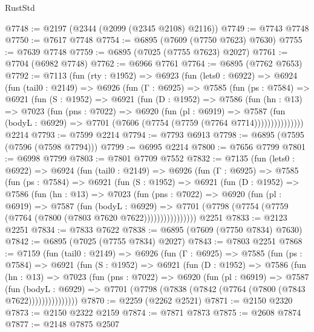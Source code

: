 \begin{lexlean}{RustStd}
\begin{coremodule}
@7748 := @2197 (@2344 (@2099 (@2345 @2108) @2116))
@7749 := @7743 @7748
@7750 := @7617 @7748
@7754 := @6895 (@7609 (@7750 @7623) @7630)
@7755 := @7639 @7748
@7759 := @6895 (@7025 (@7755 @7623) @2027)
@7761 := @7704 (@6982 @7748)
@7762 := @6966 @7761
@7764 := @6895 (@7762 @7653)
@7792 := @7113
    (fun (rty : @1952) =>
    @6923
      (fun (lets0 : @6922) =>
      @6924
        (fun (tail0 : @2149) =>
        @6926
          (fun (Γ : @6925) =>
          @7585
            (fun (ps : @7584) =>
            @6921
              (fun (S : @1952) =>
              @6921
                (fun (D : @1952) =>
                @7586
                  (fun (hn : @13) =>
                  @7023
                    (fun (pns : @7022) =>
                    @6920
                      (fun (pl : @6919) =>
                      @7587
                        (fun (bodyL : @6929) =>
                        @7701 (@7606 (@7754 (@7759 (@7764 @7714)))))))))))))))
    @2214
@7793 := @7599 @2214
@7794 := @7793 @6913
@7798 := @6895 (@7595 (@7596 (@7598 @7794)))
@7799 := @6995 @2214
@7800 := @7656 @7799
@7801 := @6998 @7799
@7803 := @7801 @7709 @7552
@7832 := @7135
    (fun (lets0 : @6922) =>
    @6924
      (fun (tail0 : @2149) =>
      @6926
        (fun (Γ : @6925) =>
        @7585
          (fun (ps : @7584) =>
          @6921
            (fun (S : @1952) =>
            @6921
              (fun (D : @1952) =>
              @7586
                (fun (hn : @13) =>
                @7023
                  (fun (pns : @7022) =>
                  @6920
                    (fun (pl : @6919) =>
                    @7587
                      (fun (bodyL : @6929) =>
                      @7701 (@7798 (@7754 (@7759 (@7764 (@7800 (@7803 @7620 @7622))))))))))))))))
    @2251
@7833 := @2123 @2251
@7834 := @7833 @7622
@7838 := @6895 (@7609 (@7750 @7834) @7630)
@7842 := @6895 (@7025 (@7755 @7834) @2027)
@7843 := @7803 @2251
@7868 := @7159
    (fun (tail0 : @2149) =>
    @6926
      (fun (Γ : @6925) =>
      @7585
        (fun (ps : @7584) =>
        @6921
          (fun (S : @1952) =>
          @6921
            (fun (D : @1952) =>
            @7586
              (fun (hn : @13) =>
              @7023
                (fun (pns : @7022) =>
                @6920
                  (fun (pl : @6919) =>
                  @7587
                    (fun (bodyL : @6929) =>
                    @7701 (@7798 (@7838 (@7842 (@7764 (@7800 (@7843 @7622)))))))))))))))
@7870 := @2259 (@2262 @2521)
@7871 := @2150 @2320
@7873 := @2150 @2322 @2159
@7874 := @7871 @7873
@7875 := @2608 @7874
@7877 := @2148 @7875 @2507

\end{coremodule}
\end{lexlean}
